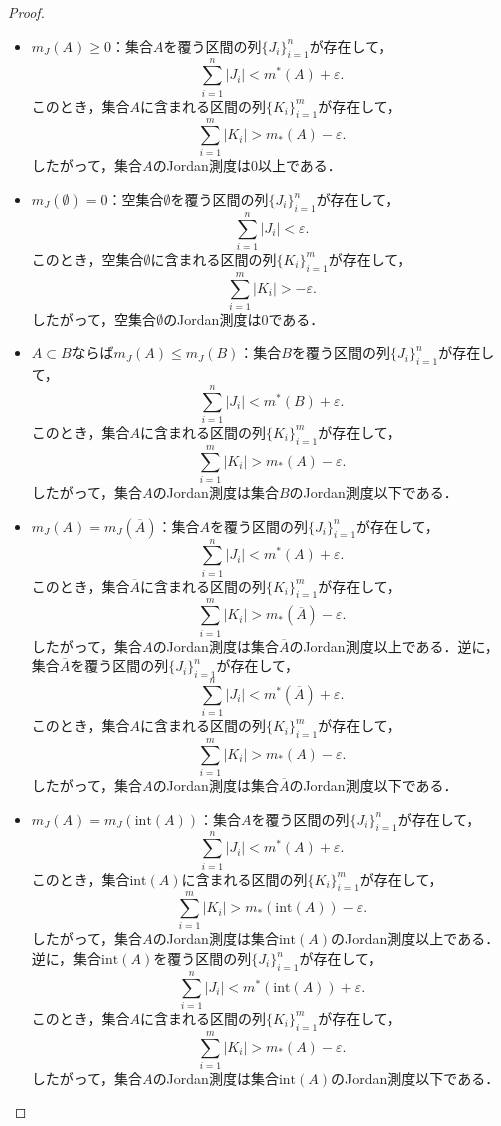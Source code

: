 \begin{proof}
    \begin{itemize}
    \item $m_J(A) \ge 0$：集合$A$を覆う区間の列$\{J_i\}_{i=1}^n$が存在して，
    \[\sum_{i=1}^n |J_i| < m^*(A) + \varepsilon.\]
    このとき，集合$A$に含まれる区間の列$\{K_i\}_{i=1}^m$が存在して，
    \[\sum_{i=1}^m |K_i| > m_*(A) - \varepsilon.\]
    したがって，集合$A$のJordan測度は0以上である．
    \item $m_J(\emptyset) = 0$：空集合$\emptyset$を覆う区間の列$\{J_i\}_{i=1}^n$が存在して，
    \[\sum_{i=1}^n |J_i| < \varepsilon.\]
    このとき，空集合$\emptyset$に含まれる区間の列$\{K_i\}_{i=1}^m$が存在して，
    \[\sum_{i=1}^m |K_i| > -\varepsilon.\]
    したがって，空集合$\emptyset$のJordan測度は0である．
    \item $A \subset B$ならば$m_J(A) \le m_J(B)$：集合$B$を覆う区間の列$\{J_i\}_{i=1}^n$が存在して，
    \[\sum_{i=1}^n |J_i| < m^*(B) + \varepsilon.\]
    このとき，集合$A$に含まれる区間の列$\{K_i\}_{i=1}^m$が存在して，
    \[\sum_{i=1}^m |K_i| > m_*(A) - \varepsilon.\]
    したがって，集合$A$のJordan測度は集合$B$のJordan測度以下である．
    \item $m_J(A) = m_J(\overline{A})$：集合$A$を覆う区間の列$\{J_i\}_{i=1}^n$が存在して，
    \[\sum_{i=1}^n |J_i| < m^*(A) + \varepsilon.\]
    このとき，集合$\overline{A}$に含まれる区間の列$\{K_i\}_{i=1}^m$が存在して，
    \[\sum_{i=1}^m |K_i| > m_*(\overline{A}) - \varepsilon.\]
    したがって，集合$A$のJordan測度は集合$\overline{A}$のJordan測度以上である．逆に，集合$\overline{A}$を覆う区間の列$\{J_i\}_{i=1}^n$が存在して，
    \[\sum_{i=1}^n |J_i| < m^*(\overline{A}) + \varepsilon.\]
    このとき，集合$A$に含まれる区間の列$\{K_i\}_{i=1}^m$が存在して，
    \[\sum_{i=1}^m |K_i| > m_*(A) - \varepsilon.\]
    したがって，集合$A$のJordan測度は集合$\overline{A}$のJordan測度以下である．
    \item $m_J(A) = m_J(\mathrm{int}(A))$：集合$A$を覆う区間の列$\{J_i\}_{i=1}^n$が存在して，
    \[\sum_{i=1}^n |J_i| < m^*(A) + \varepsilon.\]
    このとき，集合$\mathrm{int}(A)$に含まれる区間の列$\{K_i\}_{i=1}^m$が存在して，
    \[\sum_{i=1}^m |K_i| > m_*(\mathrm{int}(A)) - \varepsilon.\]
    したがって，集合$A$のJordan測度は集合$\mathrm{int}(A)$のJordan測度以上である．逆に，集合$\mathrm{int}(A)$を覆う区間の列$\{J_i\}_{i=1}^n$が存在して，
    \[\sum_{i=1}^n |J_i| < m^*(\mathrm{int}(A)) + \varepsilon.\]
    このとき，集合$A$に含まれる区間の列$\{K_i\}_{i=1}^m$が存在して，
    \[\sum_{i=1}^m |K_i| > m_*(A) - \varepsilon.\]
    したがって，集合$A$のJordan測度は集合$\mathrm{int}(A)$のJordan測度以下である．      
    \end{itemize}
\end{proof}
